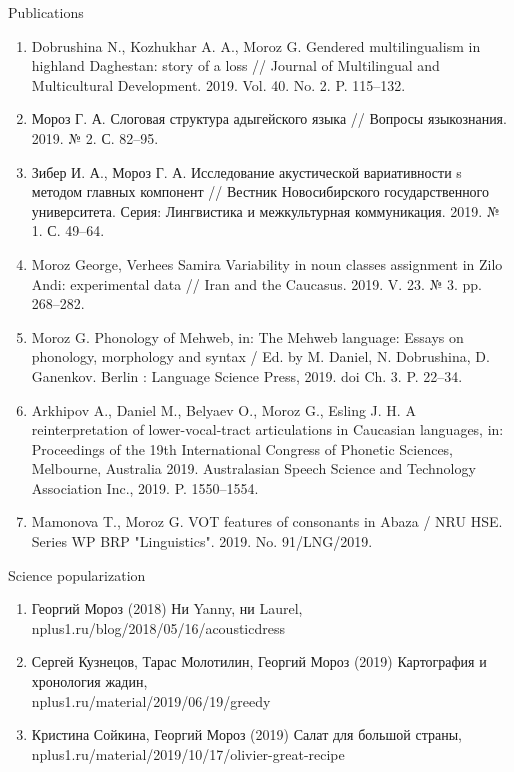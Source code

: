 \documentclass{resume} %
\begin{document}
\begin{rSection}{Publications}
\begin{enumerate}
\item  Dobrushina N., Kozhukhar A. A., Moroz G. Gendered multilingualism in highland Daghestan: story of a loss // Journal of Multilingual and Multicultural Development. 2019. Vol. 40. No. 2. P. 115--132.
\item Мороз Г. А. Слоговая структура адыгейского языка // Вопросы языкознания. 2019. № 2. С. 82--95.
\item  Зибер И. А., Мороз Г. А. Исследование акустической вариативности s методом главных компонент // Вестник Новосибирского государственного университета. Серия: Лингвистика и межкультурная коммуникация. 2019. № 1. С. 49--64.
\item Moroz George, Verhees Samira Variability in noun classes assignment in Zilo Andi: experimental data // Iran and the Caucasus. 2019. V. 23. № 3. pp. 268--282.
\item  Moroz G. Phonology of Mehweb, in: The Mehweb language: Essays on phonology, morphology and syntax / Ed. by M. Daniel, N. Dobrushina, D. Ganenkov. Berlin : Language Science Press, 2019. doi Ch. 3. P. 22--34.
\item Arkhipov A., Daniel M., Belyaev O., Moroz G., Esling J. H. A reinterpretation of lower-vocal-tract articulations in Caucasian languages, in: Proceedings of the 19th International Congress of Phonetic Sciences, Melbourne, Australia 2019. Australasian Speech Science and Technology Association Inc., 2019. P. 1550--1554.
\item Mamonova T., Moroz G. VOT features of consonants in Abaza / NRU HSE. Series WP BRP "Linguistics". 2019. No. 91/LNG/2019.
\end{enumerate}
\end{rSection}

\begin{rSection}{Science popularization}
\begin{enumerate}
\item Георгий Мороз (2018)  Ни Yanny, ни Laurel, \\ nplus1.ru/blog/2018/05/16/acousticdress
\item Сергей Кузнецов, Тарас Молотилин, Георгий Мороз (2019) Картография и хронология жадин, \\ nplus1.ru/material/2019/06/19/greedy
\item Кристина Сойкина, Георгий Мороз (2019) Салат для большой страны, \\ nplus1.ru/material/2019/10/17/olivier-great-recipe
\end{enumerate}
\end{rSection}
\end{document}
